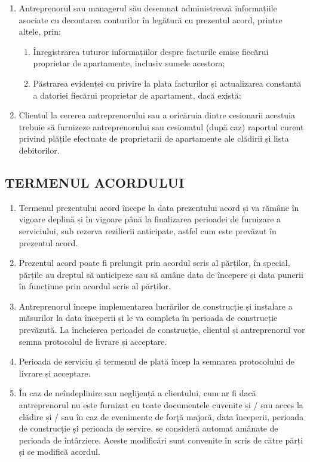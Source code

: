 \begin{multicols}{2}
\begin{enumerate}
\item Antreprenorul sau managerul său desemnat administrează informațiile asociate cu decontarea conturilor în legătură cu prezentul acord, printre altele, prin:
\begin{enumerate}
\item Înregistrarea tuturor informațiilor despre facturile emise fiecărui proprietar de apartamente, inclusiv sumele acestora;
\item Păstrarea evidenței cu privire la plata facturilor și actualizarea constantă a datoriei fiecărui proprietar de apartament, dacă există;
\end{enumerate}
\item Clientul la cererea antreprenorului sau a oricăruia dintre cesionarii acestuia trebuie să furnizeze antreprenorului sau cesionatul (după caz) raportul curent privind plățile efectuate de proprietarii de apartamente ale clădirii și lista debitorilor.
\end{enumerate}


\subsection{TERMENUL ACORDULUI}
\begin{enumerate}
\item Termenul prezentului acord începe la data prezentului acord și va rămâne în vigoare deplină și în vigoare până la finalizarea perioadei de furnizare a serviciului, sub rezerva rezilierii anticipate, astfel cum este prevăzut în prezentul acord.
\item Prezentul acord poate fi prelungit prin acordul scris al părților, în special, părțile au dreptul să anticipeze sau să amâne data de începere și data punerii în funcțiune prin acordul scris al părților.
\item Antreprenorul începe implementarea lucrărilor de construcție și instalare a măsurilor la data începerii și le va completa în perioada de construcție prevăzută. La încheierea perioadei de construcție, clientul și antreprenorul vor semna protocolul de livrare și acceptare.
\item Perioada de serviciu și termenul de plată încep la semnarea protocolului de livrare și acceptare.
\item În caz de neîndeplinire sau neglijență a clientului, cum ar fi dacă antreprenorul nu este furnizat cu toate documentele cuvenite și / sau acces la  clădire și / sau în caz de evenimente de forţă majoră, data începerii, perioada de construcție și perioada de servire. se consideră automat amânate de perioada de întârziere. Aceste modificări sunt convenite în scris de către părți și se modifică acordul.
\end{enumerate}



\end{multicols}
